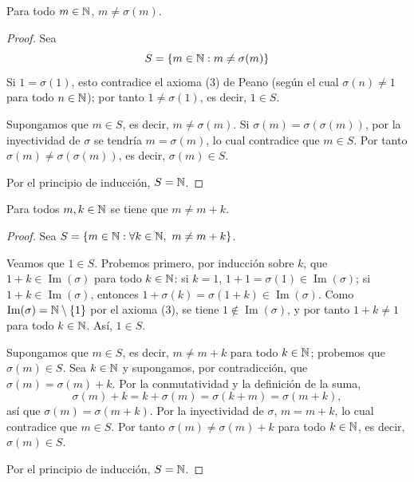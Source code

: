 \documentclass[12pt,a4paper]{book}
\begin{document}
    \begin{lema}
        \label{lem:sucesor-distinto}
        Para todo $m\in\mathbb{N}$, $m\neq\sigma(m)$.
    \end{lema}
    \begin{proof}
        Sea
        \begin{equation*}
            S=\{m\in\mathbb{N} : m\neq\sigma(m)\}
        \end{equation*}
        Si $1=\sigma(1)$, esto contradice el axioma (3) de Peano (según el cual $\sigma(n)\neq1$ para todo $n\in\mathbb{N}$); por tanto $1\neq\sigma(1)$, es decir, $1\in S$.

        Supongamos que $m\in S$, es decir, $m\neq\sigma(m)$. Si $\sigma(m)=\sigma(\sigma(m))$, por la inyectividad de $\sigma$ se tendría $m=\sigma(m)$, lo cual contradice que $m\in S$. Por tanto $\sigma(m)\neq\sigma(\sigma(m))$, es decir, $\sigma(m)\in S$.

        Por el principio de inducción, $S=\mathbb{N}$.
    \end{proof}

    \begin{lema}
        \label{lem:no-autosuma}
        Para todos $m,k\in\mathbb{N}$ se tiene que $m\neq m+k$.
    \end{lema}
    \begin{proof}
        Sea $S=\{m\in\mathbb{N} : \forall k\in\mathbb{N},\ m\neq m+k\}$.

        Veamos que $1\in S$. Probemos primero, por inducción sobre $k$, que $1+k\in\operatorname{Im}(\sigma)$ para todo $k\in\mathbb{N}$: si $k=1$, $1+1=\sigma(1)\in\operatorname{Im}(\sigma)$; si $1+k\in\operatorname{Im}(\sigma)$, entonces $1+\sigma(k)=\sigma(1+k)\in\operatorname{Im}(\sigma)$. Como $\operatorname{Im}(\sigma)=\mathbb{N}\setminus\{1\}$ por el axioma (3), se tiene $1\notin\operatorname{Im}(\sigma)$, y por tanto $1+k\neq1$ para todo $k\in\mathbb{N}$. Así, $1\in S$.

        Supongamos que $m\in S$, es decir, $m\neq m+k$ para todo $k\in\mathbb{N}$; probemos que $\sigma(m)\in S$. Sea $k\in\mathbb{N}$ y supongamos, por contradicción, que $\sigma(m)=\sigma(m)+k$. Por la conmutatividad y la definición de la suma,
        \begin{equation*}
            \sigma(m)+k = k+\sigma(m) = \sigma(k+m) = \sigma(m+k),
        \end{equation*}
        así que $\sigma(m)=\sigma(m+k)$. Por la inyectividad de $\sigma$, $m=m+k$, lo cual contradice que $m\in S$. Por tanto $\sigma(m)\neq\sigma(m)+k$ para todo $k\in\mathbb{N}$, es decir, $\sigma(m)\in S$.

        Por el principio de inducción, $S=\mathbb{N}$.
    \end{proof}
\end{document}
